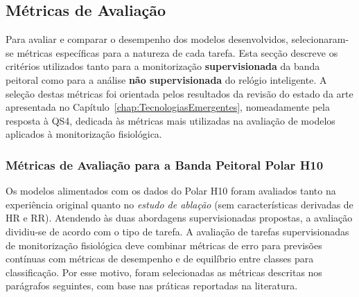 \subsection{Métricas de Avaliação}

Para avaliar e comparar o desempenho dos modelos desenvolvidos, selecionaram-se métricas específicas para a natureza de cada tarefa. Esta secção descreve os critérios utilizados tanto para a monitorização \textbf{supervisionada} da banda peitoral como para a análise \textbf{não supervisionada} do relógio inteligente. A seleção destas métricas foi orientada pelos resultados da revisão do estado da arte apresentada no Capítulo~\ref{chap:TecnologiasEmergentes}, nomeadamente pela resposta à QS4, dedicada às métricas mais utilizadas na avaliação de modelos aplicados à monitorização fisiológica.

\subsubsection*{Métricas de Avaliação para a Banda Peitoral Polar H10}

Os modelos alimentados com os dados do Polar H10 foram avaliados tanto na experiência original quanto no \textit{estudo de ablação} (sem características derivadas de HR e RR). Atendendo às duas abordagens supervisionadas propostas, a avaliação dividiu-se de acordo com o tipo de tarefa. A avaliação de tarefas supervisionadas de monitorização fisiológica deve combinar métricas de erro para previsões contínuas com métricas de desempenho e de equilíbrio entre classes para classificação. Por esse motivo, foram selecionadas as métricas descritas nos parágrafos seguintes, com base nas práticas reportadas na literatura.

